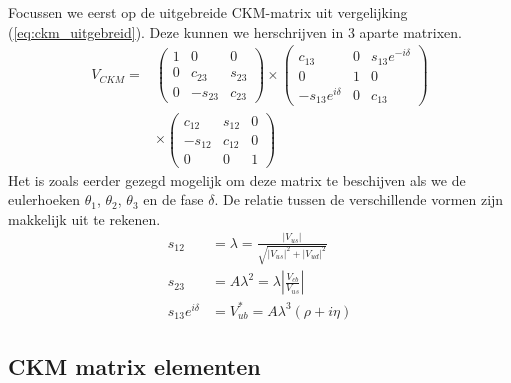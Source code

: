 \documentclass[../main.tex]{subfiles}
\begin{document}
Focussen we eerst op de uitgebreide CKM-matrix uit vergelijking (\ref{eq:ckm_uitgebreid}). Deze kunnen we herschrijven in 3 aparte matrixen.
\begin{equation}
    \begin{aligned}
        \label{eq:ckm_uitgebreid_split}
        V_{C K M}=&\left(\begin{array}{ccc}
                1 & 0 & 0 \\
                0 & c_{23} & s_{23} \\
                0 & -s_{23} & c_{23}
            \end{array}\right) \times\left(\begin{array}{ccc}
                c_{13} & 0 & s_{13} e^{-i \delta} \\
                0 & 1 & 0 \\
                -s_{13} e^{i \delta} & 0 & c_{13}
            \end{array}\right) \\
            & \times\left(\begin{array}{ccc}
                c_{12} & s_{12} & 0 \\
                -s_{12} & c_{12} & 0 \\
                0 & 0 & 1
        \end{array}\right)
    \end{aligned}
\end{equation}
Het is zoals eerder gezegd mogelijk om deze matrix te beschijven als we de eulerhoeken $\theta_1$, $\theta_2$, $\theta_3$ en de fase $\delta$. De relatie tussen de verschillende vormen zijn makkelijk uit te rekenen.
\begin{equation}
    \begin{aligned}
        \label{eq:ckm_relaties}
        s_{12} &=\lambda=\frac{\left|V_{u s}\right|}{\sqrt{\left|V_{u s}\right|^{2}+\left|V_{u d}\right|^{2}}} \\
        s_{23} &=A \lambda^{2}=\lambda\left|\frac{V_{c b}}{V_{u s}}\right| \\
        s_{13} e^{i \delta} &=V_{u b}^{*}=A \lambda^{3}(\rho+i \eta)
    \end{aligned}
\end{equation}

\subsection{CKM matrix elementen}%
\label{sub:ckm_matrix_elementen}
\end{document}

